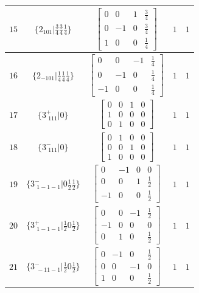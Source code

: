 \documentclass[fleqn,8pt]{jsarticle}
\begin{document}
\begin{longtable}{ccccc}
$ 15 $ & $ \{2{}_{101}|\frac{3}{4} \frac{3}{4} \frac{1}{4}\} $ & $ \begin{bmatrix} 0 & 0 & 1 & \frac{3}{4} \\ 0 & -1 & 0 & \frac{3}{4} \\ 1 & 0 & 0 & \frac{1}{4} \end{bmatrix} $ & $ 1 $ & $ 1 $ \\ \hline
$ 16 $ & $ \{2{}_{-101}|\frac{1}{4} \frac{1}{4} \frac{1}{4}\} $ & $ \begin{bmatrix} 0 & 0 & -1 & \frac{1}{4} \\ 0 & -1 & 0 & \frac{1}{4} \\ -1 & 0 & 0 & \frac{1}{4} \end{bmatrix} $ & $ 1 $ & $ 1 $ \\ \hline
$ 17 $ & $ \{3^{+}_{\,\,111}|0\} $ & $ \begin{bmatrix} 0 & 0 & 1 & 0 \\ 1 & 0 & 0 & 0 \\ 0 & 1 & 0 & 0 \end{bmatrix} $ & $ 1 $ & $ 1 $ \\ \hline
$ 18 $ & $ \{3^{-}_{\,\,111}|0\} $ & $ \begin{bmatrix} 0 & 1 & 0 & 0 \\ 0 & 0 & 1 & 0 \\ 1 & 0 & 0 & 0 \end{bmatrix} $ & $ 1 $ & $ 1 $ \\ \hline
$ 19 $ & $ \{3^{-}_{\,\,1-1-1}|0 \frac{1}{2} \frac{1}{2}\} $ & $ \begin{bmatrix} 0 & -1 & 0 & 0 \\ 0 & 0 & 1 & \frac{1}{2} \\ -1 & 0 & 0 & \frac{1}{2} \end{bmatrix} $ & $ 1 $ & $ 1 $ \\ \hline
$ 20 $ & $ \{3^{+}_{\,\,1-1-1}|\frac{1}{2} 0 \frac{1}{2}\} $ & $ \begin{bmatrix} 0 & 0 & -1 & \frac{1}{2} \\ -1 & 0 & 0 & 0 \\ 0 & 1 & 0 & \frac{1}{2} \end{bmatrix} $ & $ 1 $ & $ 1 $ \\ \hline
$ 21 $ & $ \{3^{-}_{\,\,-11-1}|\frac{1}{2} 0 \frac{1}{2}\} $ & $ \begin{bmatrix} 0 & -1 & 0 & \frac{1}{2} \\ 0 & 0 & -1 & 0 \\ 1 & 0 & 0 & \frac{1}{2} \end{bmatrix} $ & $ 1 $ & $ 1 $ \\ \hline

\end{longtable}
\end{document}
